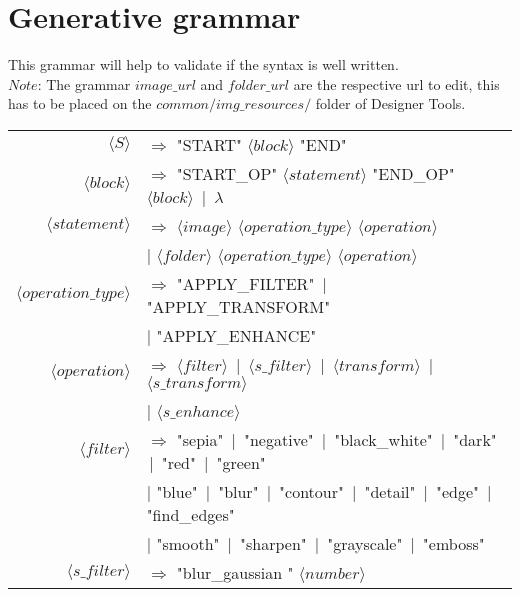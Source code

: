 \section{Generative grammar}

This grammar will help to validate if the syntax is well written.\\
$Note$: The grammar $image\_url$ and $folder\_url$ are the respective url to edit, this has to be placed on the $common/img\_resources/$ folder of Designer Tools.\\
\renewcommand{\arraystretch}{1.3}
\setlength{\tabcolsep}{10pt}
\begin{tabular}{r l}
    $\langle S \rangle$ & $\Rightarrow$ "START" $\langle block \rangle$ "END" \\
    
    $\langle block \rangle$ & $\Rightarrow$ "START\_OP" $\langle statement \rangle$ "END\_OP" $\langle block \rangle$ \,|\, $\lambda$ \\
    
    $\langle statement \rangle$ & $\Rightarrow$ $\langle image \rangle$ $\langle operation\_type \rangle$ $\langle operation \rangle$ \\
    & \quad | $\langle folder \rangle$ $\langle operation\_type \rangle$ $\langle operation \rangle$ \\
    
    $\langle operation\_type \rangle$ & $\Rightarrow$ "APPLY\_FILTER" \,|\, "APPLY\_TRANSFORM" \\
    & \quad | "APPLY\_ENHANCE" \\
    
    $\langle operation \rangle$ & $\Rightarrow$ $\langle filter \rangle$ \,|\, $\langle s\_filter \rangle$ \,|\, $\langle transform \rangle$ \,|\, $\langle s\_transform \rangle$ \\
    & \quad | $\langle s\_enhance \rangle$ \\
    
    $\langle filter \rangle$ & $\Rightarrow$ "sepia" \,|\, "negative" \,|\, "black\_white" \,|\, "dark" \,|\, "red" \,|\, "green"\\
    & \quad | "blue" \,|\, "blur" \,|\, "contour" \,|\, "detail" \,|\, "edge" \,|\, "find\_edges" \\
    & \quad | "smooth" \,|\, "sharpen" \,|\, "grayscale" \,|\, "emboss" \\
    
    $\langle s\_filter \rangle$ & $\Rightarrow$ "blur\_gaussian " $\langle number \rangle$ \\
    

\end{tabular}
